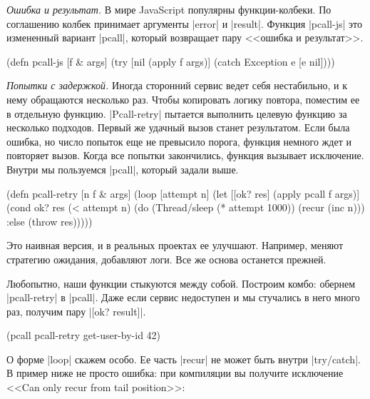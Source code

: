 \emph{Ошибка и результат.} В мире JavaScript популярны функции-колбеки. По
соглашению колбек принимает аргументы \spverb|error| и \spverb|result|. Функция
\spverb|pcall-js| это измененный вариант \spverb|pcall|, который возвращает пару
<<ошибка и результат>>.

\begin{english}
  \begin{clojure}
(defn pcall-js [f & args]
  (try
    [nil (apply f args)]
    (catch Exception e [e nil])))
  \end{clojure}
\end{english}

\emph{Попытки с задержкой.} Иногда сторонний сервис ведет себя нестабильно, и к
нему обращаются несколько раз. Чтобы копировать логику повтора, поместим ее в
отдельную функцию. \spverb|Pcall-retry| пытается выполнить целевую функцию за
несколько подходов. Первый же удачный вызов станет результатом. Если была
ошибка, но число попыток еще не превысило порога, функция немного ждет и
повторяет вызов. Когда все попытки закончились, функция вызывает
исключение. Внутри мы пользуемся \spverb|pcall|, который задали выше.

\begin{english}
  \begin{clojure}
(defn pcall-retry [n f & args]
  (loop [attempt n]
    (let [[ok? res] (apply pcall f args)]
      (cond
        ok? res
        (< attempt n)
        (do
          (Thread/sleep (* attempt 1000))
          (recur (inc n)))
        :else
        (throw res)))))
  \end{clojure}
\end{english}

Это наивная версия, и в реальных проектах ее улучшают. Например, меняют
стратегию ожидания, добавляют логи. Все же основа останется прежней.

Любопытно, наши функции стыкуются между собой. Построим комбо: обернем
\spverb|pcall-retry| в \spverb|pcall|. Даже если сервис недоступен и мы
стучались в него много раз, получим пару \spverb|[ok? result]|.

\begin{english}
  \begin{clojure}
(pcall pcall-retry get-user-by-id 42)
  \end{clojure}
\end{english}

О форме \spverb|loop| скажем особо. Ее часть \spverb|recur| не может быть внутри
\spverb|try/catch|. В пример ниже не просто ошибка: при компиляции вы получите
исключение <<Can only recur from tail position>>:

